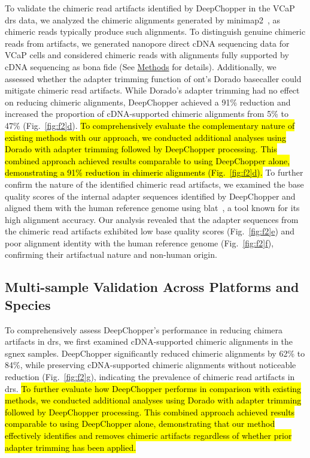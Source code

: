 \documentclass[pdflatex,sn-nature, lineno]{sn-jnl}%
\newcommand{\figref}[2]{Fig.~\hyperref[#1]{\ref*{#1}#2}}
\begin{document}
To validate the chimeric read artifacts identified by DeepChopper in the VCaP \gls{drs} data, we analyzed the chimeric alignments generated by minimap2~\cite{li2018minimap2}, as chimeric reads typically produce such alignments.
To distinguish genuine chimeric reads from artifacts, we generated nanopore direct cDNA sequencing data for VCaP cells and considered chimeric reads with alignments fully supported by cDNA sequencing as bona fide (See \hyperref[sec:methods]{Methods} for details).
Additionally, we assessed whether the adapter trimming function of \gls{ont}'s Dorado basecaller could mitigate chimeric read artifacts.
While Dorado's adapter trimming had no effect on reducing chimeric alignments, DeepChopper achieved a 91\% reduction and increased the proportion of cDNA-supported chimeric alignments from 5\% to 47\% (\figref{fig:f2}{d}).
\hl{To comprehensively evaluate the complementary nature of existing methods with our approach, we conducted additional analyses using Dorado with adapter trimming followed by DeepChopper processing. This combined approach achieved results comparable to using DeepChopper alone, demonstrating a 91\% reduction in chimeric alignments (\mbox{\figref{fig:f2}{d}}).}
To further confirm the nature of the identified chimeric read artifacts, we examined the base quality scores of the internal adapter sequences identified by DeepChopper and aligned them with the human reference genome using \gls{blat}~\cite{kent2002blat}, a tool known for its high alignment accuracy.
Our analysis revealed that the adapter sequences from the chimeric read artifacts exhibited low base quality scores (\figref{fig:f2}{e}) and poor alignment identity with the human reference genome (\figref{fig:f2}{f}), confirming their artifactual nature and non-human origin.

\subsection{Multi-sample Validation Across Platforms and Species}

To comprehensively assess DeepChopper’s performance in reducing chimera artifacts in \gls{drs}, we first examined cDNA-supported chimeric alignments in the \gls{sgnex} samples.
DeepChopper significantly reduced chimeric alignments by 62\% to 84\%, while preserving cDNA-supported chimeric alignments without noticeable reduction (\figref{fig:f2}{g}), indicating the prevalence of chimeric read artifacts in \gls{drs}.
\hl{To further evaluate how DeepChopper performs in comparison with existing methods, we conducted additional analyses using Dorado with adapter trimming followed by DeepChopper processing. This combined approach achieved results comparable to using DeepChopper alone, demonstrating that our method effectively identifies and removes chimeric artifacts regardless of whether prior adapter trimming has been applied.}
\end{document}
